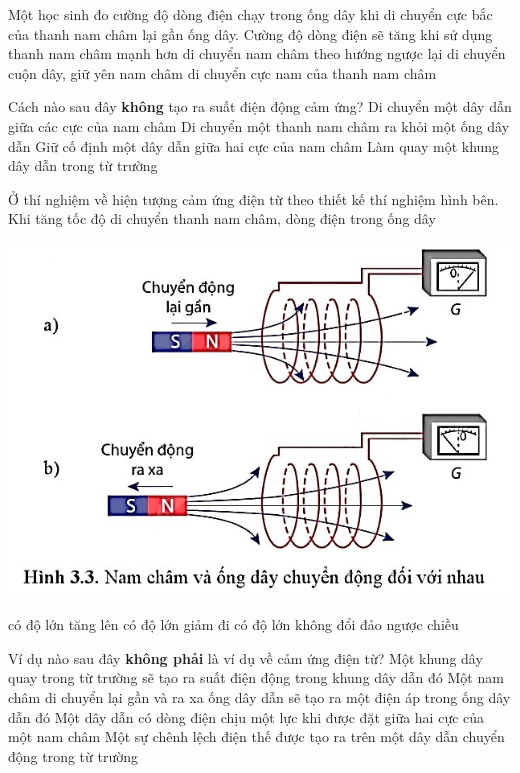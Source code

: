 \begin{ex}
	Một học sinh đo cường độ dòng điện chạy trong ống dây khi di chuyển cực bắc của thanh nam châm lại gần ống dây. Cường độ dòng điện sẽ tăng khi
	\choice
	{\True sử dụng thanh nam châm mạnh hơn}
	{di chuyển nam châm theo hướng ngược lại}
	{di chuyển cuộn dây, giữ yên nam châm}
	{di chuyển cực nam của thanh nam châm}
	\loigiai{}
\end{ex}

\begin{ex}
	Cách nào sau đây \textbf{không} tạo ra suất điện động cảm ứng?
	\choice
	{Di chuyển một dây dẫn giữa các cực của nam châm}
	{Di chuyển một thanh nam châm ra khỏi một ống dây dẫn}
	{\True Giữ cố định một dây dẫn giữa hai cực của nam châm}
	{Làm quay một khung dây dẫn trong từ trường}
	\loigiai{}
\end{ex}
\begin{ex}
	Ở thí nghiệm về hiện tượng cảm ứng điện từ theo thiết kế thí nghiệm hình bên. Khi tăng tốc độ di chuyển thanh nam châm, dòng điện trong ống dây
	\begin{center}
		\includegraphics[width=0.4\linewidth]{figs/VN12-Y24-PH-SYL-020P-17}
	\end{center}
	\choice
	{\True có độ lớn tăng lên}
	{có độ lớn giảm đi}
	{có độ lớn không đổi}
	{đảo ngược chiều}
	\loigiai{}
\end{ex}
\begin{ex}
	Ví dụ nào sau đây \textbf{không phải} là ví dụ về cảm ứng điện từ?
	\choice
	{Một khung dây quay trong từ trường sẽ tạo ra suất điện động trong khung dây dẫn đó}
	{Một nam châm di chuyển lại gần và ra xa ống dây dẫn sẽ tạo ra một điện áp trong ống dây dẫn đó}
	{\True Một dây dẫn có dòng điện chịu một lực khi được đặt giữa hai cực của một nam châm}
	{Một sự chênh lệch điện thế được tạo ra trên một dây dẫn chuyển động trong từ trường}
	\loigiai{}
\end{ex}
